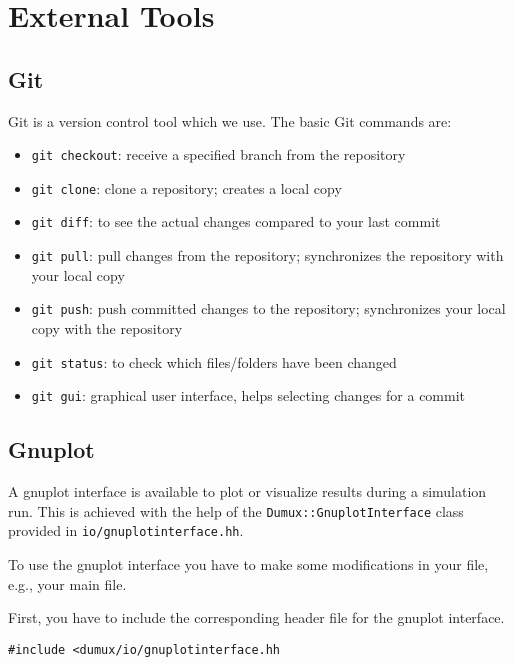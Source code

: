 
\section{External Tools}
\label{sc_externaltools}

\subsection{Git}
Git is a version control tool which we use.
The basic Git commands are:
\begin{itemize}
  \item \texttt{git checkout}: receive a specified branch from the repository
  \item \texttt{git clone}: clone a repository; creates a local copy
  \item \texttt{git diff}: to see the actual changes compared to your last commit
  \item \texttt{git pull}: pull changes from the repository; synchronizes the
  repository with your local copy
  \item \texttt{git push}: push committed changes to the repository;  synchronizes
  your local copy with the repository
  \item \texttt{git status}: to check which files/folders have been changed
  \item \texttt{git gui}: graphical user interface, helps selecting changes for
  a commit
\end{itemize}


\subsection{Gnuplot}
\label{gnuplot}
A gnuplot interface is available to plot or visualize results during a simulation run.
This is achieved with the help of the \texttt{Dumux::GnuplotInterface} class provided in \texttt{io/gnuplotinterface.hh}.

To use the gnuplot interface you have to make some modifications in your file, e.g., your main file.

First, you have to include the corresponding header file for the gnuplot interface.
\begin{lstlisting}[style=DumuxCode]
#include <dumux/io/gnuplotinterface.hh
\end{lstlisting}

